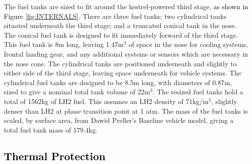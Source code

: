 		

		The fuel tanks are sized to fit around the kestrel-powered third stage, \textcolor{black}{as shown in Figure \ref{fig:INTERNALS}}. There are three fuel tanks; two cylindrical tanks situated underneath the third stage; and a truncated conical tank in the nose. The conical fuel tank is designed to fit immediately forward of the third stage. This fuel tank is 8m long, leaving 1.47m$^3$ of space in the nose for cooling systems, frontal landing gear, and any additional systems or sensors which are necessary in the nose cone. The cylindrical tanks are positioned underneath and slightly to either side of the third stage, leaving space underneath for vehicle systems. The cylindrical fuel tanks are designed to be 8.5m long, with diameters of 0.87m, sized to give a nominal total tank volume of 22m$^3$.
The resized fuel tanks hold a total of 1562kg of LH2 fuel. This assumes an LH2 density of 71kg/m$^3$, slightly denser than LH2 at phase transition point at 1 atm.
The mass of the fuel tanks is scaled, by surface area, from Dawid Preller's Baseline vehicle model\cite{Preller2017b}, giving a total fuel tank mass of 179.4kg.
		
		\textcolor{black}{
			\subsection{Thermal Protection}\label{sec:therm1}
				}
	
